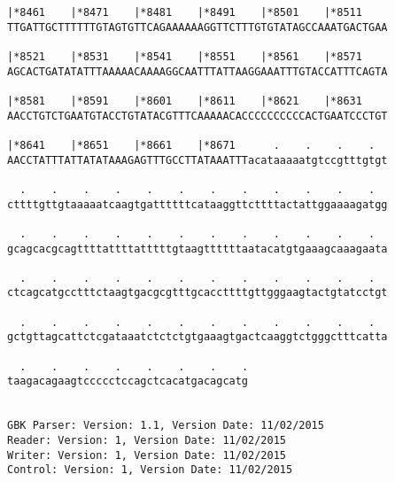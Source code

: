 \documentclass{article}
\begin{document}
\begin{Verbatim}
|*8461    |*8471    |*8481    |*8491    |*8501    |*8511    
TTGATTGCTTTTTTGTAGTGTTCAGAAAAAAGGTTCTTTGTGTATAGCCAAATGACTGAA
                                                            
|*8521    |*8531    |*8541    |*8551    |*8561    |*8571    
AGCACTGATATATTTAAAAACAAAAGGCAATTTATTAAGGAAATTTGTACCATTTCAGTA
                                                            
|*8581    |*8591    |*8601    |*8611    |*8621    |*8631    
AACCTGTCTGAATGTACCTGTATACGTTTCAAAAACACCCCCCCCCCACTGAATCCCTGT
                                                            
|*8641    |*8651    |*8661    |*8671      .    .    .    .  
AACCTATTTATTATATAAAGAGTTTGCCTTATAAATTTacataaaaatgtccgtttgtgt
                                                            
  .    .    .    .    .    .    .    .    .    .    .    .  
cttttgttgtaaaaatcaagtgattttttcataaggttcttttactattggaaaagatgg
                                                            
  .    .    .    .    .    .    .    .    .    .    .    .  
gcagcacgcagttttattttatttttgtaagttttttaatacatgtgaaagcaaagaata
                                                            
  .    .    .    .    .    .    .    .    .    .    .    .  
ctcagcatgcctttctaagtgacgcgtttgcaccttttgttgggaagtactgtatcctgt
                                                            
  .    .    .    .    .    .    .    .    .    .    .    .  
gctgttagcattctcgataaatctctctgtgaaagtgactcaaggtctgggctttcatta
                                                            
  .    .    .    .    .    .    .    .
taagacagaagtccccctccagctcacatgacagcatg
                                      
                                      
GBK Parser: Version: 1.1, Version Date: 11/02/2015
Reader: Version: 1, Version Date: 11/02/2015
Writer: Version: 1, Version Date: 11/02/2015
Control: Version: 1, Version Date: 11/02/2015
\end{Verbatim}
\end{document}
